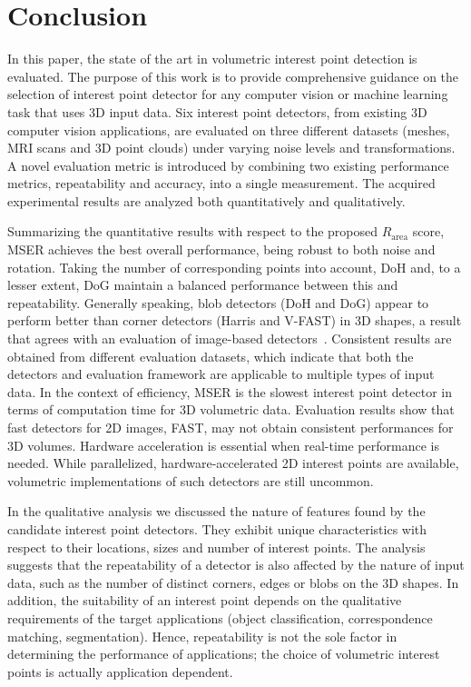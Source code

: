 


\section{Conclusion}
\label{sec:conclusion}
In this paper, the state of the art in volumetric interest point detection is evaluated. The purpose of this work is to provide comprehensive guidance on the selection of interest point detector for any computer vision or machine learning task that uses 3D input data. Six interest point detectors, from existing 3D computer vision applications, are evaluated on three different datasets (meshes, MRI scans and 3D point clouds) under varying noise levels and transformations. 
A novel evaluation metric is introduced by combining two existing performance metrics, repeatability and accuracy, into a single measurement. The acquired experimental results are analyzed both quantitatively and qualitatively.


Summarizing the quantitative results with respect to the proposed $R_{\textrm{area}}$ score, MSER achieves the best overall performance, being robust to both noise and rotation. Taking the number of corresponding points into account, DoH and, to a lesser extent, DoG maintain a balanced performance between this and repeatability. Generally speaking, blob detectors (\eg DoH and DoG) appear to perform better than corner detectors (\eg Harris and V-FAST) in 3D shapes, a result that agrees with an evaluation of image-based detectors~\cite{Mikolajczyk2005}. Consistent results are obtained from different evaluation datasets, which indicate that both the detectors and evaluation framework are applicable to multiple types of input data. In the context of efficiency, MSER is the slowest interest point detector in terms of computation time for 3D volumetric data. Evaluation results show that fast detectors for 2D images, \eg FAST, may not obtain consistent performances for 3D volumes. Hardware acceleration is essential when real-time performance is needed. While parallelized, hardware-accelerated 2D interest points are available, volumetric implementations of such detectors are still uncommon. 

In the qualitative analysis we discussed the nature of features found by the candidate interest point detectors. They exhibit unique characteristics with respect to their locations, sizes and number of interest points. 
The analysis suggests that the repeatability of a detector is also affected by the nature of input data, such as the number of distinct corners, edges or blobs on the 3D shapes. In addition, the suitability of an interest point depends on the qualitative requirements of the target applications (\eg object classification, correspondence matching, segmentation). Hence, repeatability is not the sole factor in determining the performance of applications; the choice of volumetric interest points is actually application dependent. 
